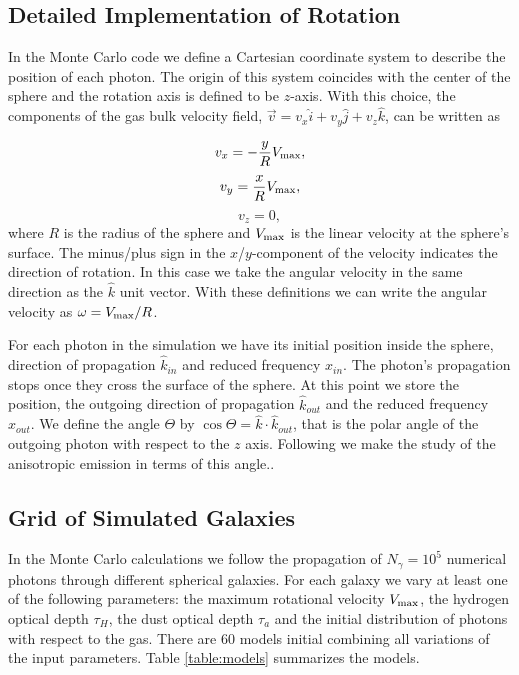 \documentclass{emulateapj}
\begin{document}
\subsection{Detailed Implementation of Rotation}

 In the Monte Carlo code we define a Cartesian coordinate system to
 describe the position of each photon. The origin of this system
 coincides with the center of the sphere and the rotation axis is defined
 to be $z$-axis. With this choice, the components of the gas bulk velocity
 field, $\vec{v} = v_{x}\hat{i} + v_{y}\hat{j} + v_{z}\hat{k}$, can be
 written as  
  
\begin{equation}
    v_{x}=-\frac{y}{R}V_{\rm max}, \label{subeq1}
\end{equation}
\begin{equation}
    v_{y}=\frac{x}{R}V_{\rm max}, \label{subeq2}
\end{equation}
\begin{equation}
    v_{z}=0, \label{subeq3}
\end{equation}
%
where $R$ is the radius of the sphere and $V_{\rm max}$ is the linear
velocity at the sphere's surface. The minus/plus sign in the
$x$/$y$-component of the velocity indicates the direction of
rotation. In this case we take the angular velocity in the same
direction as the $\hat{k}$ unit vector. With these definitions we can
write the angular velocity as $\omega=V_{\rm max}/R$.  

For each photon in the simulation we have its initial position inside
the sphere, direction of propagation $\hat{k}_{in}$ and reduced
frequency $x_{in}$. The photon's propagation stops once they cross the
surface of the sphere. At this point we store the position, the outgoing direction
of propagation $\hat{k}_{out}$ and the reduced frequency $x_{out}$. We
define the angle $\Theta$ by $\cos\Theta = \hat{k}\cdot
\hat{k}_{out}$, that is the polar angle of the outgoing photon with
respect to the $z$ axis. Following \cite{Zheng2013} we make the study
of the anisotropic emission in terms of this angle..



\subsection{Grid of Simulated Galaxies}
\label{sec:models}

In the Monte Carlo calculations we follow the propagation of $N_{\gamma}=10^5$
numerical photons through different spherical galaxies. For each galaxy
we vary at least one of the following parameters: the maximum
rotational velocity $V_{\rm max}$, the hydrogen optical depth $\tau_{H}$,
the dust optical depth $\tau_{a}$ and the initial distribution of photons
with respect to the gas. There are $60$ models initial combining all
variations of the input parameters. Table \ref{table:models}
summarizes the models.
\end{document}
